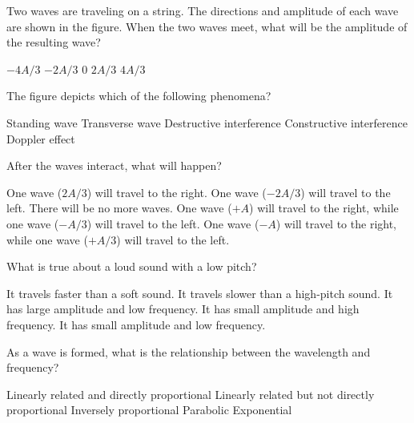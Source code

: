 \documentclass{../../../oss-ap12ibhl}
\begin{document}
\begin{questions}
  \question Two waves are traveling on a string. The directions and amplitude of
  each wave are shown in the figure. When the two waves meet, what will be the
  amplitude of the resulting wave?
  \label{des1}
  \begin{choices}
    \choice $-4A/3$
    \choice $-2A/3$
    \choice $0$
    \choice $2A/3$
    \choice $4A/3$
  \end{choices}
    
  \question The figure depicts which of the following phenomena?
  \begin{choices}
    \choice Standing wave
    \choice Transverse wave
    \choice Destructive interference
    \choice Constructive interference
    \choice Doppler effect
  \end{choices}
    
  \question After the waves interact, what will happen?
  \label{des2}
  \begin{choices}
    \choice One wave ($2A/3$) will travel to the right.
    \choice One wave ($-2A/3$) will travel to the left.
    \choice There will be no more waves.
    \choice One wave ($+A$) will travel to the right, while one wave ($-A/3$)
    will travel to the left.
    \choice One wave ($-A$) will travel to the right, while one wave ($+A/3$)
    will travel to the left.
  \end{choices}
    
  \question What is true about a loud sound with a low pitch?
  \begin{choices}
    \choice It travels faster than a soft sound.
    \choice It travels slower than a high-pitch sound.
    \choice It has large amplitude and low frequency.
    \choice It has small amplitude and high frequency.
    \choice It has small amplitude and low frequency.
  \end{choices}
    
  \question As a wave is formed, what is the relationship between the wavelength
  and frequency?
  \begin{choices}
    \choice Linearly related and directly proportional
    \choice Linearly related but not directly proportional
    \choice Inversely proportional
    \choice Parabolic
    \choice Exponential
  \end{choices}
    
    

\end{questions}
\end{document}
